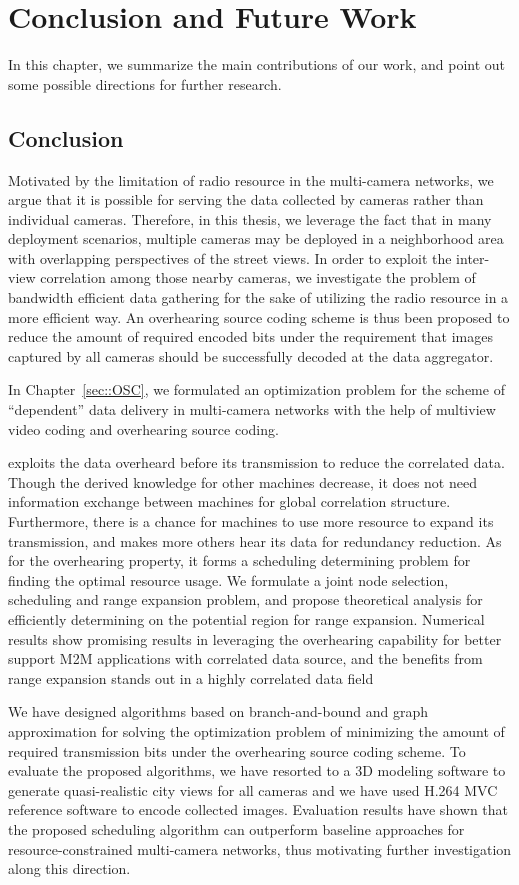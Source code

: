 \chapter{Conclusion and Future Work}
\label{sec::conclusion}
In this chapter, we summarize the main contributions of our work, and point out some possible directions for further research.
%
\section{Conclusion}
Motivated by the limitation of radio resource in the multi-camera networks, we argue that it is possible for serving the data collected by cameras rather than individual cameras.
Therefore, in this thesis, we leverage the fact that in many deployment scenarios, multiple cameras may be deployed in a neighborhood area with overlapping perspectives of the street views.
In order to exploit the inter-view correlation among those nearby cameras, we investigate the problem of bandwidth efficient data gathering for the sake of utilizing the radio resource in a more efficient way.
An overhearing source coding scheme is thus been proposed to reduce the amount of required encoded bits under the requirement that images captured by all cameras should be successfully decoded at the data aggregator. 

In Chapter~\ref{sec::OSC}, we formulated an optimization problem for the scheme of ``dependent'' data delivery in multi-camera networks with the help of multiview video coding and overhearing source coding.

 exploits the data overheard before
its transmission to reduce the correlated data. Though the derived knowledge for
other machines decrease, it does not need information exchange between machines
for global correlation structure. Furthermore, there is a chance for machines to
use more resource to expand its transmission, and makes more others hear its data
for redundancy reduction. As for the overhearing property, it forms a scheduling
determining problem for finding the optimal resource usage. We formulate a joint
node selection, scheduling and range expansion problem, and propose theoretical
analysis for efficiently determining on the potential region for range expansion.
Numerical results show promising results in leveraging the overhearing capability
for better support M2M applications with correlated data source, and the benefits
from range expansion stands out in a highly correlated data field

We have designed algorithms based on branch-and-bound and graph approximation for solving the optimization problem of minimizing the amount of required transmission bits under the overhearing source coding scheme.
To evaluate the proposed algorithms, we have resorted to a 3D modeling software to generate quasi-realistic city views for all cameras and we have used H.264 MVC reference software to encode collected images.
Evaluation results have shown that the proposed scheduling algorithm can outperform baseline approaches for resource-constrained multi-camera networks, thus motivating further investigation along this direction.
%
